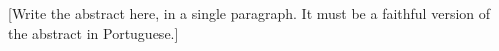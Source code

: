 [Write the abstract here, in a single paragraph. It must be a faithful version of the abstract in Portuguese.]

